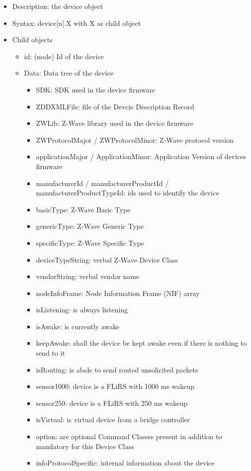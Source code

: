 \begin {itemize}
\item Description: the device object
\item Syntax:  device[n].X with  X as child object
\item Child objects
\begin {itemize}
\item id: (node) Id of the device
\item Data: Data tree of the device
\begin {itemize}
\item SDK: SDK used in the device firmware
\item ZDDXMLFile: file of the Devcie Description Record
\item ZWLib: Z-Wave library used in the device firmware
\item ZWProtocolMajor / ZWProtocolMinor: Z-Wave protocol version
\item applicationMajor / ApplicationMinor: Application Version of devices firmware
\item manufacturerId / manufacturerProductId / manufacturerProductTypeId: ids used to identify the device
\item basicType: Z-Wave Basic Type
\item genericType: Z-Wave Generic Type
\item specificType: Z-Wave Specific Type
\item deviceTypeString: verbal Z-Wave Device Class
\item vendorString: verbal vendor name

\item nodeInfoFrame: Node Information Frame (NIF) array
\item isListening: is always listening
\item isAwake: is currently awake
\item keepAwake: shall the device be kept awake even if there is nothing to send to it
\item isRouting: is abale to send routed unsolicited packets
\item sensor1000: device is a FLiRS with 1000 ms wakeup
\item sensor250: device is a FLiRS with 250 ms wakeup
\item isVirtual: is virtual device from a bridge controller
\item option: are optional Command Classes present in addition to mandatory for this Device Class
\item infoProtocolSpecific: internal information about the device


\end{itemize}
\end{itemize}
\end{itemize}
